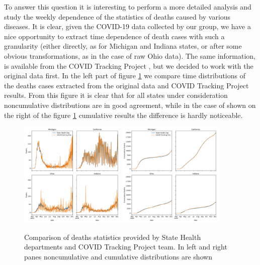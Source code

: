 \documentclass[conference]{IEEEtran}
\begin{document}
To answer this question it is interesting to perform a more detailed analysis and study the weekly dependence of the statistics of deaths caused by various diseases. It is clear, given the COVID-19 data collected by our group, we have a nice opportunity to extract time dependence of death cases with such a granularity (either directly, as for Michigan and Indiana states, or after some obvious transformations, as in the case of raw Ohio data). The same information, is available from the COVID Tracking Project \cite{covid19tracking_covid_nodate}, but we decided to work with the original data first. In the left part of figure \ref{fig:RT_comp} we compare time distributions of the deaths cases extracted from the original data and COVID Tracking Project results. From this figure it is clear that for all states under consideration noncumulative distributions are in good agreement, while in the case of shown on the right of the figure \ref{fig:RT_comp} cumulative results the difference is hardly noticeable.

\begin{figure}
  \centering
  \includegraphics[width=0.45\textwidth]{figs/raw_tracker_comp_nc}
  \includegraphics[width=0.45\textwidth]{figs/raw_tracker_comp_cum}
  \caption{Comparison of deaths statistics provided by State Health departments and COVID Tracking Project team. In left and right panes noncumulative and cumulative distributions are shown}
  \label{fig:RT_comp}
\end{figure}
\end{document}
